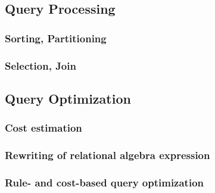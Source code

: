 \subsection{Query Processing}
\subsubsection{Sorting, Partitioning}
\subsubsection{Selection, Join}

\subsection{Query Optimization}
\subsubsection{Cost estimation}
\subsubsection{Rewriting of relational algebra expression}
\subsubsection{Rule- and cost-based query optimization}

